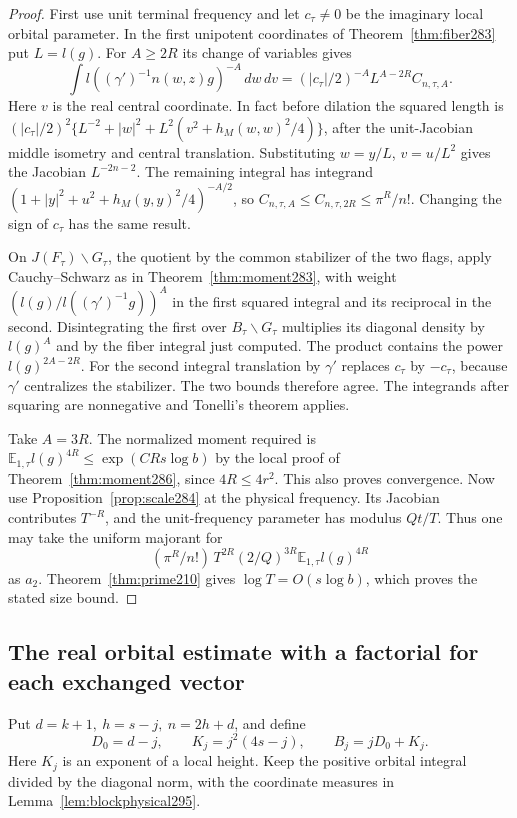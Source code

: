 \documentclass[a4paper,11pt]{article}
\theoremstyle{definition}
\theoremstyle{remark}
\numberwithin{equation}{section}
\begin{document}
\begin{proof}
First use unit terminal frequency and let \(c_\tau\ne0\)
be the imaginary local orbital parameter. In the first
unipotent coordinates of Theorem~\ref{thm:fiber283} put
\(L=l(g)\). For \(A\ge2R\) its change of variables gives
\[
 \int l((\gamma')^{-1}n(w,z)g)^{-A}\,dw\,dv
     =(|c_\tau|/2)^{-A} L^{A-2R} C_{n,\tau,A} .
\]
Here \(v\) is the real central coordinate. In fact before
dilation the squared length is
\((|c_\tau|/2)^2\{L^{-2}+|w|^2+
L^2(v^2+h_M(w,w)^2/4)\}\), after the unit-Jacobian middle
isometry and central translation. Substituting \(w=y/L\),
\(v=u/L^2\) gives the Jacobian \(L^{-2n-2}\).
The remaining integral has integrand
\((1+|y|^2+u^2+h_M(y,y)^2/4)^{-A/2}\), so
\(C_{n,\tau,A}\le C_{n,\tau,2R}\le\pi^R/n!\).
Changing the sign of \(c_\tau\) has the same result.

On \(J(F_\tau)\backslash G_\tau\), the quotient by the
common stabilizer of the two flags, apply Cauchy--Schwarz as in
Theorem~\ref{thm:moment283}, with weight
\((l(g)/l((\gamma')^{-1}g))^A\) in the first squared
integral and its reciprocal in the second.
Disintegrating the first over \(B_\tau\backslash G_\tau\)
multiplies its diagonal density by \(l(g)^A\) and by the
fiber integral just computed. The product contains the
power \(l(g)^{2A-2R}\). For the second integral translation
by \(\gamma'\) replaces \(c_\tau\) by \(-c_\tau\), because
\(\gamma'\) centralizes the stabilizer. The two bounds
therefore agree. The integrands after squaring are
nonnegative and Tonelli's theorem applies.

Take \(A=3R\). The normalized moment required is
\(\mathbb E_{1,\tau}l(g)^{4R}\le\exp(CRs\log b)\)
by the local proof of Theorem~\ref{thm:moment286}, since
\(4R\le4r^2\). This also proves convergence. Now use
Proposition~\ref{prop:scale284} at the physical frequency.
Its Jacobian contributes \(T^{-R}\), and the unit-frequency
parameter has modulus \(Qt/T\). Thus one may take the
uniform majorant for
\[
     (\pi^R/n!)\,T^{2R}(2/Q)^{3R}
                           \mathbb E_{1,\tau}l(g)^{4R}
\]
as \(a_2\). Theorem~\ref{thm:prime210} gives
\(\log T=O(s\log b)\), which proves the stated size bound.
\end{proof}

\subsection{The real orbital estimate with a factorial for each exchanged vector}\label{nav:VII-56}
Put \(d=k+1,\ h=s-j,\ n=2h+d\), and define
\[
 D_0=d-j,\qquad K_j=j^2(4s-j),\qquad
                         B_j=jD_0+K_j .
\]
Here \(K_j\) is an exponent of a local height. Keep the positive
orbital integral divided by the diagonal norm, with the
coordinate measures in Lemma~\ref{lem:blockphysical295}.
\end{document}
